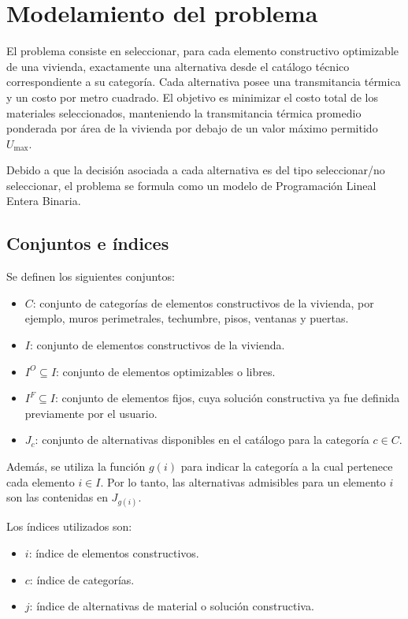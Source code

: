 \section{Modelamiento del problema}

El problema consiste en seleccionar, para cada elemento constructivo optimizable
de una vivienda, exactamente una alternativa desde el catálogo técnico
correspondiente a su categoría. Cada alternativa posee una transmitancia
térmica y un costo por metro cuadrado. El objetivo es minimizar el costo total
de los materiales seleccionados, manteniendo la transmitancia térmica promedio
ponderada por área de la vivienda por debajo de un valor máximo permitido
$U_{\max}$.

Debido a que la decisión asociada a cada alternativa es del tipo
seleccionar/no seleccionar, el problema se formula como un modelo de
Programación Lineal Entera Binaria.

\subsection{Conjuntos e índices}

Se definen los siguientes conjuntos:

\begin{itemize}
    \item $C$: conjunto de categorías de elementos constructivos de la vivienda,
    por ejemplo, muros perimetrales, techumbre, pisos, ventanas y puertas.
    \item $I$: conjunto de elementos constructivos de la vivienda.
    \item $I^{O} \subseteq I$: conjunto de elementos optimizables o libres.
    \item $I^{F} \subseteq I$: conjunto de elementos fijos, cuya solución
    constructiva ya fue definida previamente por el usuario.
    \item $J_c$: conjunto de alternativas disponibles en el catálogo para la
    categoría $c \in C$.
\end{itemize}

Además, se utiliza la función $g(i)$ para indicar la categoría a la cual
pertenece cada elemento $i \in I$. Por lo tanto, las alternativas admisibles
para un elemento $i$ son las contenidas en $J_{g(i)}$.

Los índices utilizados son:

\begin{itemize}
    \item $i$: índice de elementos constructivos.
    \item $c$: índice de categorías.
    \item $j$: índice de alternativas de material o solución constructiva.
\end{itemize}

